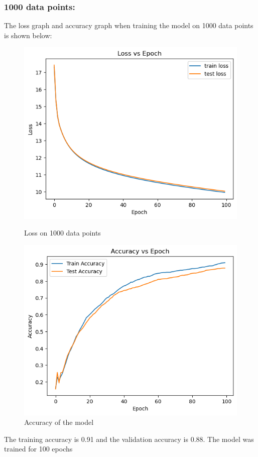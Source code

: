 \documentclass{article}
\begin{document}
\subsubsection*{1000 data points:}
The loss graph and accuracy graph when training the model on 1000 data points is shown below:
\begin{figure}[h!]
    \centering
    \begin{minipage}{0.45\textwidth}
        \centering
        \includegraphics[width=1\textwidth]{loss_1000.png} %
        \caption{Loss on 1000 data points}
    \end{minipage}\hfill
    \begin{minipage}{0.45\textwidth}
        \centering
        \includegraphics[width=1\textwidth]{accuracy_1000.png} %
        \caption{Accuracy of the model}
    \end{minipage}
\end{figure}
\newline The training accuracy is 0.91 and the validation accuracy is 0.88. The model was trained for 100 epochs
\end{document}
